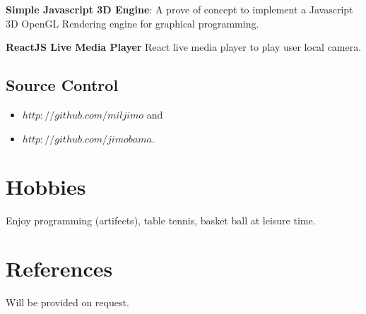 \documentclass[11px]{article}
\begin{document}
\textbf{Simple Javascript 3D Engine}: A prove of concept to implement a Javascript 3D OpenGL Rendering engine for graphical programming.

\textbf{ReactJS Live Media Player} React  live media player to play user local camera.



\subsection{Source Control}
\begin{itemize}
	\item $http://github.com/miljimo$ and
	\item  $  http://github.com/jimobama .$
\end{itemize} 
\hrulefill
\section{Hobbies}
Enjoy programming (artifects), table tennis, basket ball at leisure time.
\section*{References}
Will be provided on request.
\end{document}
